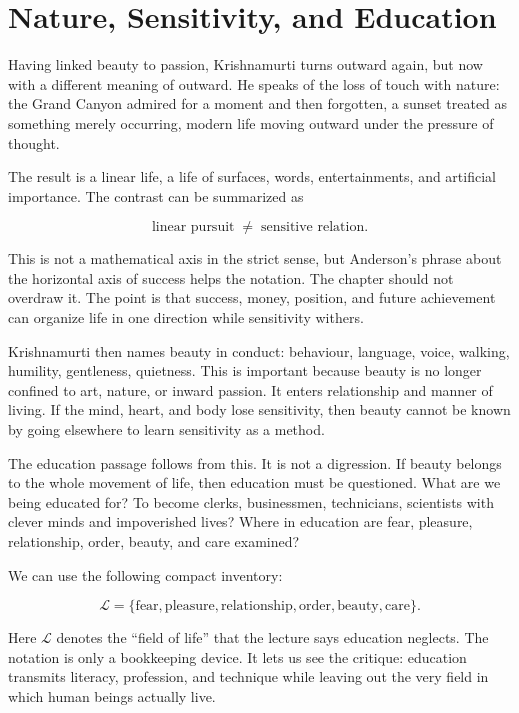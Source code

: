 \section{Nature, Sensitivity, and Education}

Having linked beauty to passion, Krishnamurti turns outward again, but now with a different meaning of outward. He speaks of the loss of touch with nature: the Grand Canyon admired for a moment and then forgotten, a sunset treated as something merely occurring, modern life moving outward under the pressure of thought.

The result is a linear life, a life of surfaces, words, entertainments, and artificial importance. The contrast can be summarized as

\begin{equation}
\text{linear pursuit}
\;\neq\;
\text{sensitive relation}.
\end{equation}

This is not a mathematical axis in the strict sense, but Anderson's phrase about the horizontal axis of success helps the notation. The chapter should not overdraw it. The point is that success, money, position, and future achievement can organize life in one direction while sensitivity withers.

Krishnamurti then names beauty in conduct: behaviour, language, voice, walking, humility, gentleness, quietness. This is important because beauty is no longer confined to art, nature, or inward passion. It enters relationship and manner of living. If the mind, heart, and body lose sensitivity, then beauty cannot be known by going elsewhere to learn sensitivity as a method.

The education passage follows from this. It is not a digression. If beauty belongs to the whole movement of life, then education must be questioned. What are we being educated for? To become clerks, businessmen, technicians, scientists with clever minds and impoverished lives? Where in education are fear, pleasure, relationship, order, beauty, and care examined?

We can use the following compact inventory:

\begin{equation}
\mathcal{L}
=
\{\text{fear},\text{pleasure},\text{relationship},\text{order},
\text{beauty},\text{care}\}.
\end{equation}

Here \(\mathcal{L}\) denotes the ``field of life'' that the lecture says education neglects. The notation is only a bookkeeping device. It lets us see the critique: education transmits literacy, profession, and technique while leaving out the very field in which human beings actually live.

